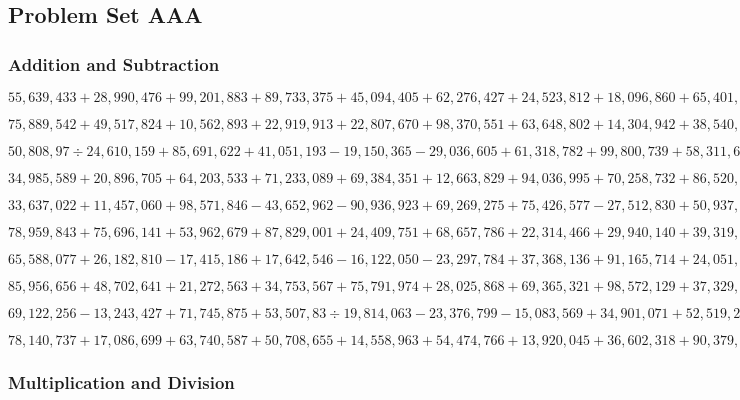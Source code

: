 \hypertarget{problem-set-aaa-23}{%
\subsection{Problem Set AAA}\label{problem-set-aaa-23}}

\hypertarget{addition-and-subtraction-379}{%
\subsubsection{Addition and
Subtraction}\label{addition-and-subtraction-379}}

\(55,639,433+28,990,476+99,201,883+89,733,375+45,094,405+62,276,427+24,523,812+18,096,860+65,401,556+91,335,679\)

\(75,889,542+49,517,824+10,562,893+22,919,913+22,807,670+98,370,551+63,648,802+14,304,942+38,540,795+87,946,815\)

\(50,808,97÷24,610,159+85,691,622+41,051,193-19,150,365-29,036,605+61,318,782+99,800,739+58,311,603-90,672,635\)

\(34,985,589+20,896,705+64,203,533+71,233,089+69,384,351+12,663,829+94,036,995+70,258,732+86,520,073+75,923,451\)

\(33,637,022+11,457,060+98,571,846-43,652,962-90,936,923+69,269,275+75,426,577-27,512,830+50,937,148-21,067,605\)

\(78,959,843+75,696,141+53,962,679+87,829,001+24,409,751+68,657,786+22,314,466+29,940,140+39,319,133+45,638,462\)

\(65,588,077+26,182,810-17,415,186+17,642,546-16,122,050-23,297,784+37,368,136+91,165,714+24,051,309-11,594,641\)

\(85,956,656+48,702,641+21,272,563+34,753,567+75,791,974+28,025,868+69,365,321+98,572,129+37,329,285+71,603,958\)

\(69,122,256-13,243,427+71,745,875+53,507,83÷19,814,063-23,376,799-15,083,569+34,901,071+52,519,202+28,245,428\)

\(78,140,737+17,086,699+63,740,587+50,708,655+14,558,963+54,474,766+13,920,045+36,602,318+90,379,532+23,980,473\)

\hypertarget{multiplication-and-division-378}{%
\subsubsection{Multiplication and
Division}\label{multiplication-and-division-378}}

